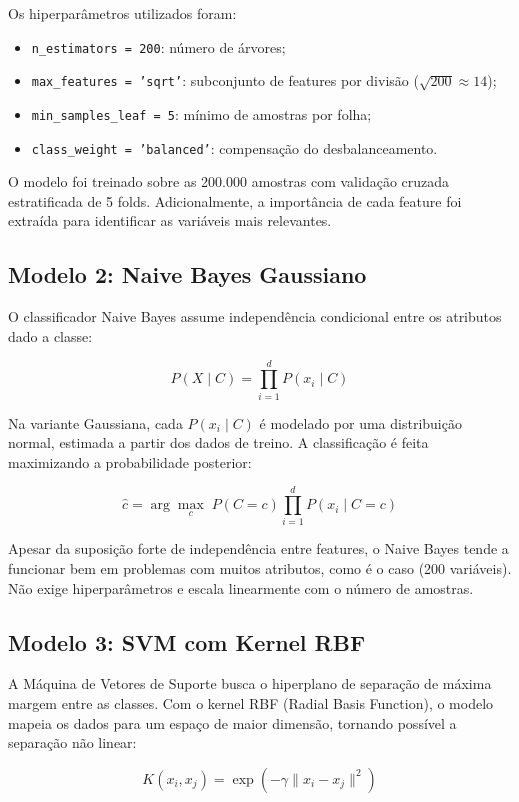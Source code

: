 \documentclass[a4paper,12pt]{article}
\begin{document}
Os hiperparâmetros utilizados foram:

\begin{itemize}
    \item \texttt{n\_estimators = 200}: número de árvores;
    \item \texttt{max\_features = 'sqrt'}: subconjunto de features por divisão ($\sqrt{200} \approx 14$);
    \item \texttt{min\_samples\_leaf = 5}: mínimo de amostras por folha;
    \item \texttt{class\_weight = 'balanced'}: compensação do desbalanceamento.
\end{itemize}

O modelo foi treinado sobre as 200.000 amostras com validação cruzada estratificada de 5 folds. Adicionalmente, a importância de cada feature foi extraída para identificar as variáveis mais relevantes.

\subsection{Modelo 2: Naive Bayes Gaussiano}

O classificador Naive Bayes assume independência condicional entre os atributos dado a classe:

\[
P(X \mid C) = \prod_{i=1}^{d} P(x_i \mid C)
\]

Na variante Gaussiana, cada $P(x_i \mid C)$ é modelado por uma distribuição normal, estimada a partir dos dados de treino. A classificação é feita maximizando a probabilidade posterior:

\[
\hat{c} = \arg\max_c \; P(C=c) \prod_{i=1}^{d} P(x_i \mid C=c)
\]

Apesar da suposição forte de independência entre features, o Naive Bayes tende a funcionar bem em problemas com muitos atributos, como é o caso (200 variáveis). Não exige hiperparâmetros e escala linearmente com o número de amostras.

\subsection{Modelo 3: SVM com Kernel RBF}

A Máquina de Vetores de Suporte busca o hiperplano de separação de máxima margem entre as classes. Com o kernel RBF (Radial Basis Function), o modelo mapeia os dados para um espaço de maior dimensão, tornando possível a separação não linear:

\[
K(x_i, x_j) = \exp\!\left(-\gamma \|x_i - x_j\|^2\right)
\]
\end{document}
